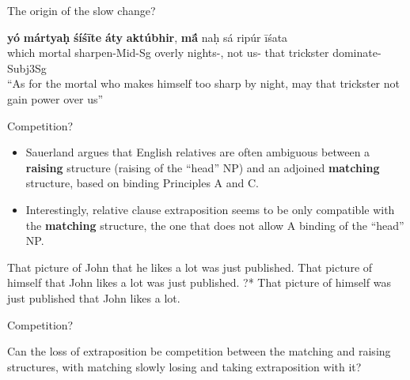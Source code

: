 \documentclass[hyperref={pdfpagelabels=false}]{beamer}
\begin{document}
\begin{frame}{The origin of the slow change?}
    \begin{exe}

\ex \label{vediccar1} \gll \textbf{yó} \textbf{mártya\d{h}} \textbf{śíś\={i}te} \textbf{áty} \textbf{aktúbhir}, \textbf{m\={\'{a}}} na\d{h} sá ripúr \={i}śata \\
which mortal sharpen-Mid-Sg overly nights-, not us- that trickster dominate-Subj3Sg\\
\quad ``As for the mortal who makes himself too sharp by night, may that trickster not gain power over us''\\
\citep[RV 1.36.16, cited in][156]{kiparsky1995}
\end{exe}
\end{frame}



\begin{frame}{Competition? \citet{sauerland2003}}
 \begin{itemize}
	\item Sauerland argues that English relatives are often ambiguous between a \textbf{raising} structure (raising of the ``head'' NP) and an adjoined \textbf{matching} structure, based on binding Principles A and C.
	\item Interestingly, relative clause extraposition seems to be only compatible with the \textbf{matching} structure, the one that does not allow A binding of the ``head'' NP.
\end{itemize}

\begin{exe}
	\ex That picture of John that he likes a lot was just published.
	\ex That picture of himself that John likes a lot was just published.
	\ex ?* That picture of himself was just published that John likes a lot.
\end{exe}
\end{frame}

\begin{frame}{Competition? \citet{sauerland2003}}
 
 Can the loss of extraposition be competition between the matching and raising structures, with matching slowly losing and taking extraposition with it?\\

\end{frame}
\end{document}
